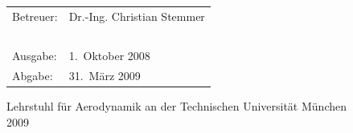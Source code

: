 \begin{center}
\vspace*{1.2cm}
\normalsize
\vfill
\begin{tabular}{ll}
Betreuer: &  Dr.-Ing. Christian Stemmer \\
\ & \ \\
Ausgabe: & 1.\ Oktober 2008\\
Abgabe: & 31.\ M\"{a}rz 2009\\
\end{tabular}

\vspace*{1.6cm}
Lehrstuhl f\"{u}r Aerodynamik an der Technischen Universit\"{a}t M\"{u}nchen\\
2009
\end{center}

\pagebreak
\pagestyle{plain}

%

